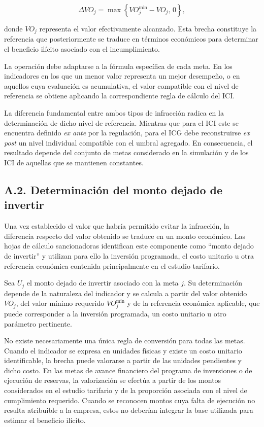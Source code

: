 \begin{equation}
\label{eq:brecha_cumplimiento}
\Delta VO_j
=
\max\left\{
VO_j^{\min}-VO_j,\,
0
\right\},
\end{equation}

donde \(VO_j\) representa el valor efectivamente alcanzado. Esta brecha constituye la referencia que posteriormente se traduce en términos económicos para determinar el beneficio ilícito asociado con el incumplimiento.

La operación debe adaptarse a la fórmula específica de cada meta. En los indicadores en los que un menor valor representa un mejor desempeño, o en aquellos cuya evaluación es acumulativa, el valor compatible con el nivel de referencia se obtiene aplicando la correspondiente regla de cálculo del ICI.

La diferencia fundamental entre ambos tipos de infracción radica en la determinación de dicho nivel de referencia. Mientras que para el ICI este se encuentra definido \textit{ex ante} por la regulación, para el ICG debe reconstruirse \textit{ex post} un nivel individual compatible con el umbral agregado. En consecuencia, el resultado depende del conjunto de metas considerado en la simulación y de los ICI de aquellas que se mantienen constantes.

\subsection*{A.2. Determinación del monto dejado de invertir}

Una vez establecido el valor que habría permitido evitar la infracción, la diferencia respecto del valor obtenido se traduce en un monto económico. Las hojas de cálculo sancionadoras identifican este componente como ``monto dejado de invertir'' y utilizan para ello la inversión programada, el costo unitario u otra referencia económica contenida principalmente en el estudio tarifario.

Sea \(U_j\) el monto dejado de invertir asociado con la meta \(j\). Su determinación depende de la naturaleza del indicador y se calcula a partir del valor obtenido \(VO_j\), del valor mínimo requerido \(VO_j^{\min}\) y de la referencia económica aplicable, que puede corresponder a la inversión programada, un costo unitario u otro parámetro pertinente.

No existe necesariamente una única regla de conversión para todas las metas. Cuando el indicador se expresa en unidades físicas y existe un costo unitario identificable, la brecha puede valorarse a partir de las unidades pendientes y dicho costo. En las metas de avance financiero del programa de inversiones o de ejecución de reservas, la valorización se efectúa a partir de los montos considerados en el estudio tarifario y de la proporción asociada con el nivel de cumplimiento requerido. Cuando se reconocen montos cuya falta de ejecución no resulta atribuible a la empresa, estos no deberían integrar la base utilizada para estimar el beneficio ilícito.


